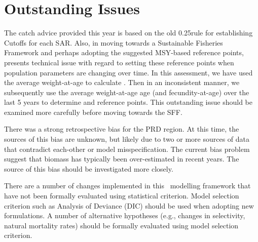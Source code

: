 \section{Outstanding Issues}

The catch advice provided this year is based on the old 0.25\bo rule for establishing Cutoffs for each SAR.  Also, in moving towards a Sustainable Fisheries Framework and perhaps adopting the suggested MSY-based reference points, presents technical issue with regard to setting these reference points when population parameters are changing over time.  In this assessment, we have used the average weight-at-age to calculate \bo.  Then in an inconsistent manner, we subsequently use the average weight-at-age age (and fecundity-at-age) over the last 5 years to determine \bmsy and \fmsy reference points.  This outstanding issue should be examined more carefully before moving towards the SFF.

There was a strong retrospective bias for the PRD region. At this time, the sources of this bias are unknown, but likely due to two or more sources of data that contradict each-other or model misspecification.  The current bias problem suggest that biomass has typically been over-estimated in recent years.  The source of this bias should be investigated more closely.

There are a number of changes implemented in this \iscam\ modelling framework that have not been formally evaluated using statistical criterion. Model selection criterion such as Analysis of Deviance (DIC) should be used when adopting new formulations.  A number of alternative hypotheses (e.g., changes in selectivity, natural mortality rates) should be formally evaluated using model selection criterion.


